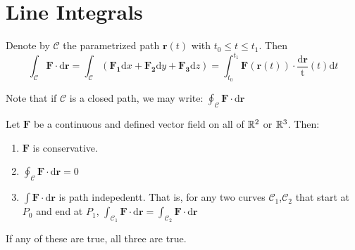 	\section{Line Integrals}
	\begin{definition}
		Denote by $\mathcal{C}$ the parametrized path $\mathbf{r}(t)$ with $t_0 \leq t \leq t_1$. Then
		\[
			\int_\mathcal{C} \mathbf{F} \cdot \mathrm{d}\mathbf{r}=\int_\mathcal{C} (\mathbf{F_1}\mathrm{d}x + \mathbf{F_2}\mathrm{d}y + \mathbf{F_3}\mathrm{d}z) = \int_{t_0}^{t_1} \mathbf{F}\left( \mathbf{r}(t) \right) \cdot \frac{\mathrm{d} \mathbf{r}}{\mathrm t} (t) \mathrm{d}t 
		\] 
	\end{definition}
	\begin{remark}
		Note that if $\mathcal{C}$ is a closed path, we may write: $\oint_\mathcal{C} \mathbf{F}\cdot \mathrm{d}\mathbf{r}$
	\end{remark}
	\begin{theorem}
		Let $\mathbf{F}$ be a continuous and defined vector field on all of $\mathbb{R}^{2}$ or $\mathbb{R}^{3}$. Then:
		\begin{enumerate}
			\item $\mathbf{F}$ is conservative.
			\item $\oint_\mathcal{C}\mathbf{F}\cdot\mathrm{d}\mathbf{r} = 0$
			\item $\int\mathbf{F}\cdot\mathrm{d}\mathbf{r}$ is path indepedentt. That is, for any two curves $\mathcal{C}_1$,$\mathcal{C}_2$ that start at $P_0$ and end at $P_1$, $\int_{\mathcal{C}_1} \mathbf{F}\cdot\mathrm{d}\mathbf{r}=\int_{\mathcal{C}_2} \mathbf{F}\cdot\mathrm{d}\mathbf{r} $
		\end{enumerate}
		If any of these are true, all three are true.
	\end{theorem}

